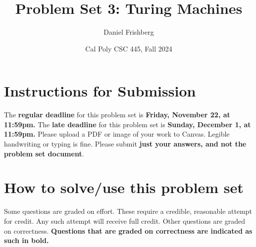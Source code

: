 \documentclass{article}
\title{Problem Set 3: Turing Machines}
\author{Daniel Frishberg}
\date{Cal Poly CSC 445, Fall 2024}
\theoremstyle{definition}
\begin{document}
\lstset{upquote=true}
\setlength\parindent{0em}

\maketitle
\section{Instructions for Submission}
The \textbf{regular deadline} for this problem set is \textbf{Friday, November 22, at 11:59pm.} The \textbf{late deadline} for this problem set is \textbf{Sunday, December 1, at 11:59pm.} Please upload a PDF or image of your work to Canvas. Legible handwriting or typing is fine. Please submit \textbf{just your answers, and not the problem set document}.

\section{How to solve/use this problem set}
Some questions are graded on effort. These require a credible, reasonable attempt for credit. Any such attempt will receive full credit. Other questions are graded on correctness.
\textbf{Questions that are graded on correctness are indicated as such in bold.}
\end{document}

